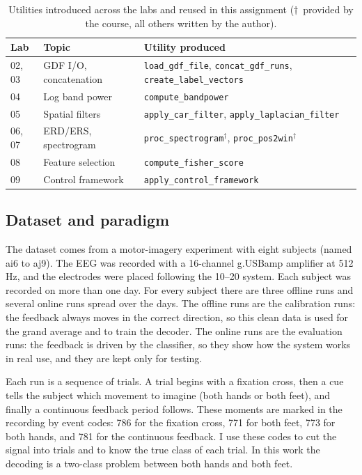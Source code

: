 \documentclass[10pt,twocolumn,a4paper]{article}
\begin{document}
\begin{table}[h]
\centering
\caption{Utilities introduced across the labs and reused in this assignment
($\dagger$~provided by the course, all others written by the author).}
\label{tab:labs}
\small
\begin{tabular}{@{}lp{2.0cm}p{3.1cm}@{}}
\toprule
Lab & Topic & Utility produced \\
\midrule
02, 03 & GDF I/O, concatenation & \texttt{load\_gdf\_file}, \texttt{concat\_gdf\_runs}, \texttt{create\_label\_vectors} \\
04     & Log band power & \texttt{compute\_bandpower} \\
05     & Spatial filters & \texttt{apply\_car\_filter}, \texttt{apply\_laplacian\_filter} \\
06, 07 & ERD/ERS, spectrogram & \texttt{proc\_spectrogram}$^{\dagger}$, \texttt{proc\_pos2win}$^{\dagger}$ \\
08     & Feature selection & \texttt{compute\_fisher\_score} \\
09     & Control framework & \texttt{apply\_control\_framework} \\
\bottomrule
\end{tabular}
\end{table}

\subsection{Dataset and paradigm}
\label{sec:data}

The dataset comes from a motor-imagery experiment with eight subjects (named
ai6 to aj9). The EEG was recorded with a 16-channel g.USBamp amplifier at
512\,Hz, and the electrodes were placed following the 10--20 system. Each
subject was recorded on more than one day. For every subject there are three
offline runs and several online runs spread over the days. The offline runs are
the calibration runs: the feedback always moves in the correct direction, so
this clean data is used for the grand average and to train the decoder. The
online runs are the evaluation runs: the feedback is driven by the classifier,
so they show how the system works in real use, and they are kept only for
testing.

Each run is a sequence of trials. A trial begins with a fixation cross, then a
cue tells the subject which movement to imagine (both hands or both feet), and
finally a continuous feedback period follows. These moments are marked in the
recording by event codes: 786 for the fixation cross, 771 for both feet, 773 for
both hands, and 781 for the continuous feedback. I use these codes to cut the
signal into trials and to know the true class of each trial. In this work the
decoding is a two-class problem between both hands and both feet.
\end{document}
